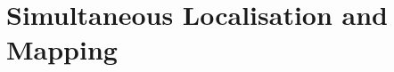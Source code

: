 \graphicspath{{introduction/fig/}}

\chapter{Simultaneous Localisation and Mapping}
\label{chap:Simultaneous Localisation and Mapping}
